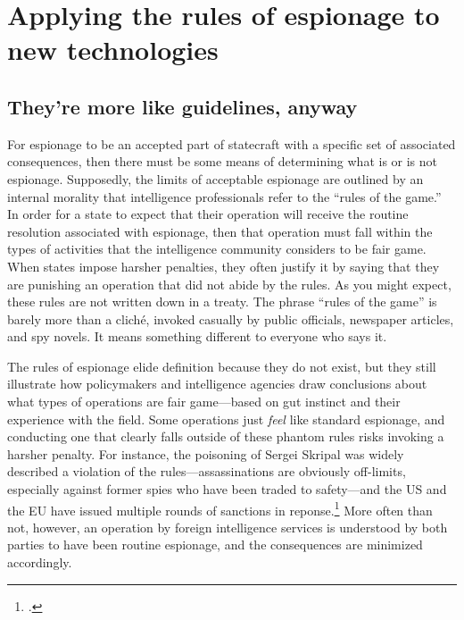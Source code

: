 \documentclass{report}
\begin{document}



\section{Applying the rules of espionage to new technologies}
\subsection{They're more like guidelines, anyway}
For espionage to be an accepted part of statecraft with a specific set of associated consequences, then there must be some means of determining what is or is not espionage. Supposedly, the limits of acceptable espionage are outlined by an internal morality that intelligence professionals refer to the ``rules of the game.'' In order for a state to expect that their operation will receive the routine resolution associated with espionage, then that operation must fall within the types of activities that the intelligence community considers to be fair game. When states impose harsher penalties, they often justify it by saying that they are punishing an operation that did not abide by the rules. As you might expect, these rules are not written down in a treaty. The phrase ``rules of the game'' is barely more than a clich\'e, invoked casually by public officials, newspaper articles, and spy novels. It means something different to everyone who says it.

The rules of espionage elide definition because they do not exist, but they still illustrate how policymakers and intelligence agencies draw conclusions about what types of operations are fair game---based on gut instinct and their experience with the field. Some operations just \emph{feel} like standard espionage, and conducting one that clearly falls outside of these phantom rules risks invoking a harsher penalty. For instance, the poisoning of Sergei Skripal was widely described a violation of the rules---assassinations are obviously off-limits, especially against former spies who have been traded to safety---and the US and the EU have issued multiple rounds of sanctions in reponse.\footcite{reuters_e.u._2019} More often than not, however, an operation by foreign intelligence services is understood by both parties to have been routine espionage, and the consequences are minimized accordingly.
\end{document}
